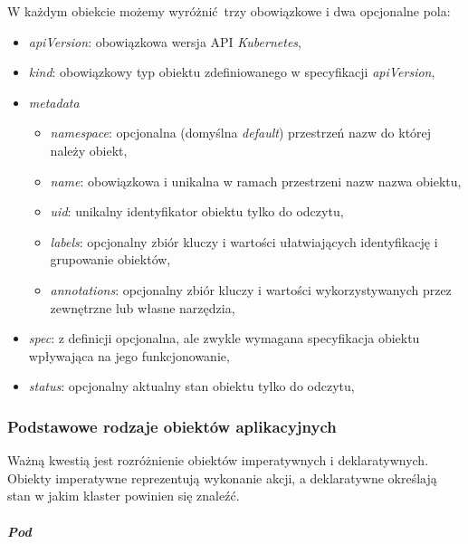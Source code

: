 \documentclass[a4paper,12pt,twoside,openany]{report}
\providecommand{\tightlist}{%
  \setlength{\itemsep}{0pt}\setlength{\parskip}{0pt}}
\begin{document}
W każdym obiekcie możemy wyróżnić~trzy obowiązkowe i dwa opcjonalne
pola:

\begin{itemize}
\tightlist
\item
  \emph{apiVersion}: obowiązkowa wersja API \emph{Kubernetes},
\item
  \emph{kind}: obowiązkowy typ obiektu zdefiniowanego w specyfikacji
  \emph{apiVersion},
\item
  \emph{metadata}

  \begin{itemize}
  \tightlist
  \item
    \emph{namespace}: opcjonalna (domyślna \emph{default}) przestrzeń
    nazw do której należy obiekt,
  \item
    \emph{name}: obowiązkowa i unikalna w ramach przestrzeni nazw nazwa
    obiektu,
  \item
    \emph{uid}: unikalny identyfikator obiektu tylko do odczytu,
  \item
    \emph{labels}: opcjonalny zbiór kluczy i wartości ułatwiających
    identyfikację i grupowanie obiektów,
  \item
    \emph{annotations}: opcjonalny zbiór kluczy i wartości
    wykorzystywanych przez zewnętrzne lub własne narzędzia,\\
  \end{itemize}
\item
  \emph{spec}: z definicji opcjonalna, ale zwykle wymagana specyfikacja
  obiektu wpływająca na jego funkcjonowanie,
\item
  \emph{status}: opcjonalny aktualny stan obiektu tylko do odczytu,
\end{itemize}

\hypertarget{podstawowe-rodzaje-obiektuxf3w-aplikacyjnych}{%
\subsubsection{Podstawowe rodzaje obiektów
aplikacyjnych}\label{podstawowe-rodzaje-obiektuxf3w-aplikacyjnych}}

Ważną kwestią jest rozróżnienie obiektów imperatywnych i deklaratywnych.
Obiekty imperatywne reprezentują wykonanie akcji, a deklaratywne
określają stan w jakim klaster powinien się znaleźć.

\hypertarget{pod}{%
\paragraph{\texorpdfstring{\emph{Pod}}{Pod}}\label{pod}}
\end{document}
